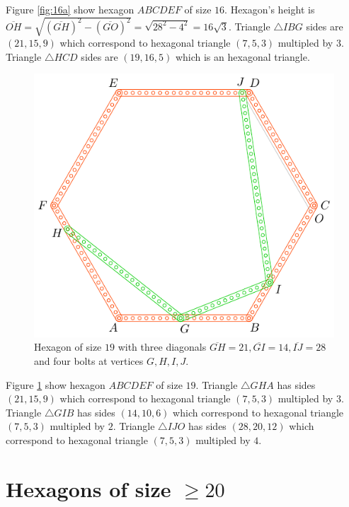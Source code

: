 \documentclass[11pt]{article}
\begin{document}
Figure \ref{fig:16a} show hexagon $ABCDEF$ of size $16$. Hexagon's height is $\overline{OH}=\sqrt{(\overline{GH})^2-(\overline{GO})^2}=\sqrt{28^2-4^2}=16\sqrt3$. Triangle $\triangle{IBG}$ sides are $(21,15,9)$ which correspond to hexagonal triangle $(7,5,3)$ multipled by $3$. Triangle $\triangle{HCD}$ sides are $(19,16,5)$ which is an hexagonal triangle.

\begin{figure}[H]
\centering
\includegraphics[scale=1]{19/hexa-19a}
\caption{Hexagon of size $19$ with three diagonals $\overline{GH} = 21, \overline{GI} = 14, \overline{IJ} = 28$ and four bolts at vertices $G,H,I,J$.}
\label{fig:19a}
\end{figure}

Figure \ref{fig:19a} show hexagon $ABCDEF$ of size $19$. Triangle $\triangle{GHA}$ has sides $(21,15,9)$ which correspond to hexagonal triangle $(7,5,3)$ multipled by $3$. Triangle $\triangle{GIB}$ has sides $(14,10,6)$ which correspond to hexagonal triangle $(7,5,3)$ multipled by $2$. Triangle $\triangle{IJO}$ has sides $(28,20,12)$ which correspond to hexagonal triangle $(7,5,3)$ multipled by $4$.

\section{Hexagons of size $\ge 20$}
\end{document}
